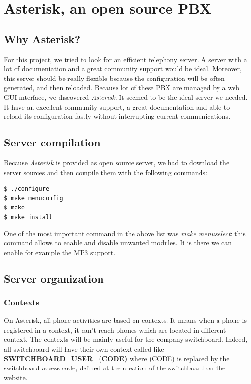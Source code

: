 \chapter{Asterisk, an open source PBX}

\section{Why Asterisk?}
For this project, we tried to look for an efficient telephony server. A server with a lot of documentation and a great community support would be ideal. Moreover, this server should be really flexible because the configuration will be often generated, and then reloaded.
Because lot of these PBX are managed by a web GUI interface, we discovered \textit{Asterisk}. It seemed to be the ideal server we needed. It have an excellent community support, a great documentation and able to reload its configuration fastly without interrupting current communications.

\section{Server compilation}
Because \textit{Asterisk} is provided as open source server, we had to download the server sources and then compile them with the following commands:
\begin{lstlisting}[language=bash,caption={bash}]
$ ./configure
$ make menuconfig
$ make
$ make install
\end{lstlisting}

One of the most important command in the above list was \textit{make menuselect}: this command allows to enable and disable unwanted modules. It is there we can enable for example the MP3 support.

\section{Server organization}

\subsection{Contexts}
On Asterisk, all phone activities are based on contexts. It means when a phone is registered in a context, it can't reach phones which are located in different context. The contexts will be mainly useful for the company switchboard. Indeed, all switchboard will have their own context called like \textbf{SWITCHBOARD\_USER\_(CODE)} where (CODE) is replaced by the switchboard access code, defined at the creation of the switchboard on the website.\newline

